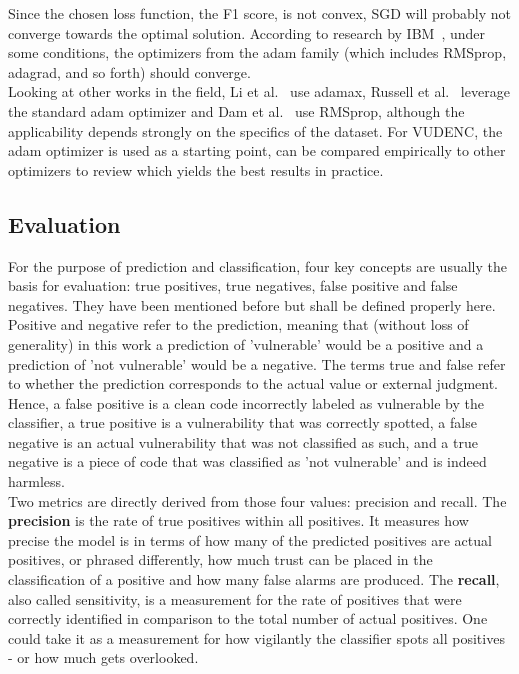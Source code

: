 \documentclass[
a4paper,
pagesize,
pdftex,
12pt,
ngerman,
fleqn,
final,
]{scrartcl}
\begin{document}
	Since the chosen loss function, the F1 score, is not convex, SGD will probably not converge towards the optimal solution. According to research by IBM~\cite{IBMResearchEditorialStaff.6.5.2019}, under some conditions, the optimizers from the adam family (which includes RMSprop, adagrad, and so forth) should converge.\\
	Looking at other works in the field, Li et al.~\cite{Li.2018} use adamax, Russell et al.~\cite{Russell.2018} leverage the standard adam optimizer and Dam et al.~\cite{Dam.2017} use RMSprop, although the applicability depends strongly on the specifics of the dataset. For VUDENC, the adam optimizer is used as a starting point, can be compared empirically to other optimizers to review which yields the best results in practice.
	
	\subsection{Evaluation}\label{Evaluation criteria}
	For the purpose of prediction and classification, four key concepts are usually the basis for evaluation: true positives, true negatives, false positive and false negatives. They have been mentioned before but shall be defined properly here. Positive and negative refer to the prediction, meaning that (without loss of generality) in this work a prediction of 'vulnerable' would be a positive and a prediction of 'not vulnerable' would be a negative. The terms true and false refer to whether the prediction corresponds to the actual value or external judgment. Hence, a false positive is a clean code incorrectly labeled as vulnerable by the classifier, a true positive is a vulnerability that was correctly spotted, a false negative is an actual vulnerability that was not classified as such, and a true negative is a piece of code that was classified as 'not vulnerable' and is indeed harmless.\\
	Two metrics are directly derived from those four values: precision and recall. The \textbf{precision} is the rate of true positives within all positives. It measures how precise the model is in terms of how many of the predicted positives are actual positives, or phrased differently, how much trust can be placed in the classification of a positive and how many false alarms are produced. The \textbf{recall}, also called sensitivity, is a measurement for the rate of positives that were correctly identified in comparison to the total number of actual positives. One could take it as a measurement for how vigilantly the classifier spots all positives - or how much gets overlooked.\newline
\end{document}
